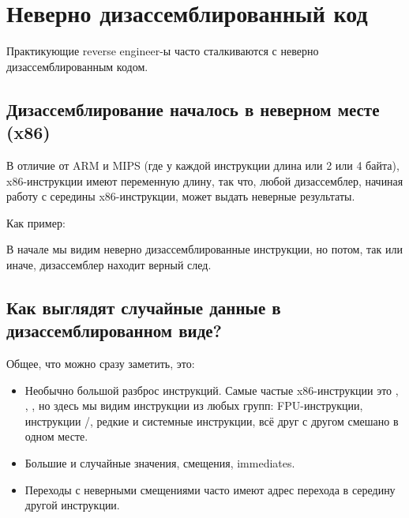 \chapter{Неверно дизассемблированный код}
\label{sec:incorrectly_disasmed_code}

Практикующие reverse engineer-ы часто сталкиваются с неверно дизассемблированным кодом.

\section{Дизассемблирование началось в неверном месте (x86)}

В отличие от ARM и MIPS (где у каждой инструкции длина или 2 или 4 байта), x86-инструкции имеют переменную длину,
так что, любой дизассемблер, начиная работу с середины x86-инструкции, может выдать неверные результаты.

Как пример:



В начале мы видим неверно дизассемблированные инструкции, но потом, так или иначе, дизассемблер находит верный след.

\section{Как выглядят случайные данные в дизассемблированном виде?}

Общее, что можно сразу заметить, это:

\begin{itemize}
\item Необычно большой разброс инструкций.
Самые частые x86-инструкции это \PUSH{}, \MOV{}, \CALL{}, 
но здесь мы видим
инструкции из любых групп: \ac{FPU}-инструкции, инструкции /, редкие и системные инструкции, всё друг с другом смешано в одном месте.

\item Большие и случайные значения, смещения, immediates.

\item Переходы с неверными смещениями часто имеют адрес перехода в середину другой инструкции.
\end{itemize}




